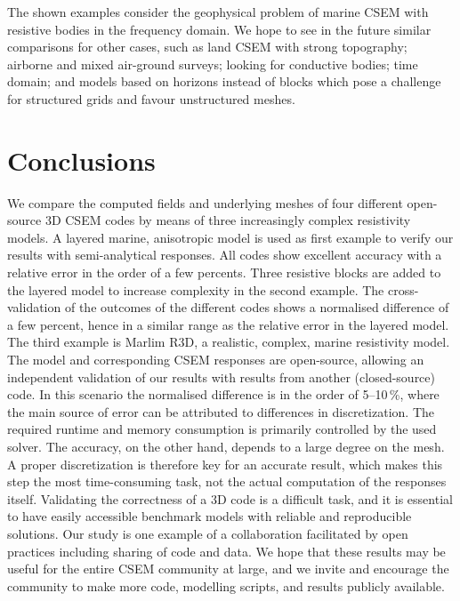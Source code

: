 \documentclass[extra, camera,%
]{gji}
\begin{document}
The shown examples consider the geophysical problem of marine CSEM with resistive bodies in the frequency domain.  We hope to see in the future  similar comparisons for other cases, such as land CSEM with strong topography; airborne and mixed air-ground surveys; looking for conductive bodies; time domain; and models based on horizons instead of blocks which pose a challenge for structured grids and favour unstructured meshes. 

\section{Conclusions}

We compare the computed fields and underlying meshes of four different open-source 3D CSEM codes by means of three increasingly complex resistivity models. A layered marine, anisotropic model is used as first example to verify our results with semi-analytical responses. All codes show excellent accuracy with a relative error in the order of a few percents. Three resistive blocks are added to the layered model to increase complexity in the second example. The cross-validation of the outcomes of the different codes shows a normalised difference of a few percent, hence in a similar range as the relative error in the layered model. The third example is Marlim R3D, a realistic, complex, marine resistivity model. The model and corresponding CSEM responses are open-source, allowing an independent validation of our results with results from another (closed-source) code. In this scenario the normalised difference is in the order of 5--10\,\%, where the main source of error can be attributed to differences in discretization. The required runtime and memory consumption is primarily controlled by the used solver. The accuracy, on the other hand, depends to a large degree on the mesh. A proper discretization is therefore key for an accurate result, which makes this step the most time-consuming task, not the actual computation of the responses itself. Validating the correctness of a 3D code is a difficult task, and it is essential to have easily accessible benchmark models with reliable and reproducible solutions. Our study is one example of a collaboration facilitated by open practices including sharing of code and data. We hope that these results may be useful for the entire CSEM community at large, and we invite and encourage the community to make more code, modelling scripts, and results publicly available.
\end{document}
